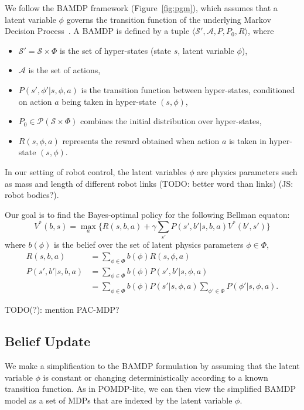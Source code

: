 \documentclass{article}
\newcommand{\figref}[1]{Figure~\ref{#1}}%
\begin{document}
We follow the BAMDP framework (\figref{fig:pgm}), which assumes that a latent variable $\phi$ governs the transition function of the underlying Markov Decision Process~\cite{ghavamzadeh2015bayesian, ross2008bayes, guez2012efficient}.
A BAMDP is defined by a tuple $\langle \mathcal{S}', \mathcal{A}, P, P_0, R \rangle$, where
\begin{itemize}
\item $\mathcal{S'} = \mathcal{S}\times \Phi$ is the set of hyper-states (state $s$, latent variable $\phi$),
\item $\mathcal{A}$ is the set of actions,
\item $P(s',\phi'|s, \phi, a)$ is the transition function between hyper-states, conditioned
on action $a$ being taken in hyper-state $(s, \phi)$,
\item $P_0\in \mathcal{P}(\mathcal{S} \times \Phi)$ combines the initial distribution over hyper-states,
\item $R(s, \phi, a)$ represents the reward obtained when action $a$ is
taken in hyper-state $(s,\phi)$.
\end{itemize}
In our setting of robot control, the latent variables $\phi$ are physics parameters such as mass and length of different robot links (TODO: better word than links) (JS: robot bodies?).

Our goal is to find the Bayes-optimal policy for the following Bellman equaton:
\begin{equation}\label{eq:rl}
V^*(b, s) = \max_a \bigg\{R(s, b, a) + \gamma \sum_{s'}P(s', b'|s, b, a)V^*(b', s') \bigg\}
\end{equation}
where $b(\phi)$ is the belief over the set of latent physics parameters $\phi \in \Phi$,
\begin{align*}
R(s, b, a)
  &= \sum_{\phi \in \Phi} b(\phi) R(s, \phi, a) \\
P(s', b' | s, b, a)
  &= \sum_{\phi \in \Phi} b(\phi) P(s', b' | s, \phi, a) \\
  &= \sum_{\phi \in \Phi} b(\phi) P(s' | s, \phi, a) \sum_{\phi' \in \Phi} P(\phi' | s, \phi, a).
\end{align*}

TODO(?): mention PAC-MDP?

\subsection{Belief Update}

We make a simplification to the BAMDP formulation by assuming that the latent variable $\phi$ is constant or changing deterministically according to a known transition function.
As in POMDP-lite\cite{chen2016pomdp}, we can then view the simplified BAMDP model as a set of MDPs that are indexed by the latent variable $\phi$.
\end{document}
